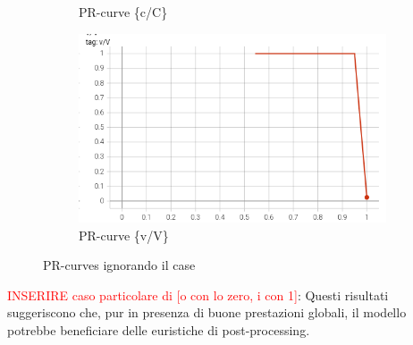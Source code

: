 \begin{figure}[htbp]
\begin{subfigure}[t]{0.32\textwidth}
        \caption{PR-curve \{c/C\}}
    \end{subfigure}
    \begin{subfigure}[t]{0.32\textwidth}
        \centering
        \includegraphics[width=\textwidth]{images/pr_ignore3.png}
        \caption{PR-curve \{v/V\}}
    \end{subfigure}
    \caption{PR-curves ignorando il case}
    \label{fig:pr-ignore}
\end{figure}

\textcolor{red}{INSERIRE caso particolare di [o con lo zero, i con 1]}:
Questi risultati suggeriscono che, pur in presenza di buone prestazioni globali, il modello potrebbe beneficiare delle euristiche di post-processing.


